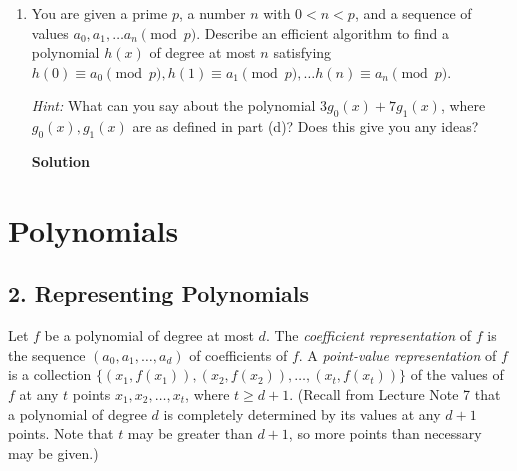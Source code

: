 \documentclass{article}\usepackage{amsmath,amssymb,amsthm,tikz,tkz-graph,color,chngpage,soul,hyperref,csquotes,graphicx,floatrow}\newcommand*{\QEDB}{\hfill\ensuremath{\square}}\newtheorem*{prop}{Proposition}\renewcommand{\theenumi}{\alph{enumi}}\usepackage[shortlabels]{enumitem}\usepackage[nobreak=true]{mdframed}\usetikzlibrary{matrix,calc}\MakeOuterQuote{"}\usepackage[margin=0.75in]{geometry} \newtheorem{theorem}{Theorem}
\begin{document}
\begin{enumerate}
\begin{mdframed}
\end{mdframed}
\item You are given a prime $p$, a number $n$ with $0<n<p$, and a sequence of values $a_0,a_1,\ldots a_n\pmod p$. Describe an efficient algorithm to find a polynomial $h(x)$ of degree at most $n$ satisfying $h(0)\equiv a_0\pmod p, h(1)\equiv a_1\pmod p, \ldots h(n)\equiv a_n\pmod p$.

\textit{Hint:} What can you say about the polynomial $3g_0(x)+7g_1(x)$, where $g_0(x),g_1(x)$ are as defined in part (d)? Does this give you any ideas?
\begin{mdframed}
\textbf{Solution}

\end{mdframed}
\end{enumerate}
\clearpage

\section*{Polynomials}

\subsection*{2. Representing Polynomials}
Let $f$ be a polynomial of degree at most $d$. The \textit{coefficient representation} of $f$ is the sequence $(a_0,a_1,\ldots,a_d)$ of coefficients of $f$. A \textit{point-value representation} of $f$ is a collection $\{(x_1,f(x_1)),(x_2,f(x_2)),\ldots,(x_t,f(x_t))\}$ of the values of $f$ at any $t$ points $x_1,x_2,\ldots,x_t$, where $t\geqslant d+1$. (Recall from Lecture Note 7 that a polynomial of degree $d$ is completely determined by its values at any $d + 1$ points. Note that $t$ may be greater than $d + 1$, so more points than necessary may be given.)

\vspace{3mm}
\end{document}
